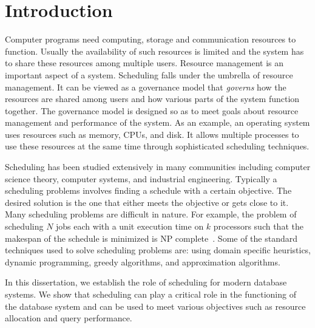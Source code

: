 \chapter{Introduction}
Computer programs need computing, storage and communication resources to function. 
Usually the availability of such resources is limited and the system has to share these resources among multiple users. 
Resource management is an important aspect of a system.
Scheduling falls under the umbrella of resource management. 
It can be viewed as a governance model that \textit{governs} how the resources are shared among users and how various parts of the system function together. 
The governance model is designed so as to meet goals about resource management and performance of the system. 
As an example, an operating system uses resources such as memory, CPUs, and disk.
It allows multiple processes to use these resources at the same time through sophisticated scheduling techniques. 

Scheduling has been studied extensively in many communities including computer science theory, computer systems, and industrial engineering. 
Typically a scheduling problems involves finding a schedule with a certain objective.
The desired solution is the one that either meets the objective or gets close to it.
Many scheduling problems are difficult in nature.
For example, the problem of scheduling $N$ jobs each with a unit execution time on $k$ processors such that the makespan of the schedule is minimized is NP complete~\cite{ULLMAN1975384}.
Some of the standard techniques used to solve scheduling problems are: using domain specific heuristics, dynamic programming, greedy algorithms, and approximation algorithms. 

In this dissertation, we establish the role of scheduling for modern database systems.
We show that scheduling can play a critical role in the functioning of the database system and can be used to meet various objectives such as resource allocation and query performance.

